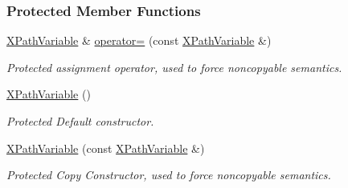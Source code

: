 \subsubsection*{Protected Member Functions}
\begin{DoxyCompactItemize}
\item 
\hyperlink{classphys_1_1xml_1_1XPathVariable}{XPathVariable} \& \hyperlink{classphys_1_1xml_1_1XPathVariable_aa0d4555101b253e1864a5226dd098ad3}{operator=} (const \hyperlink{classphys_1_1xml_1_1XPathVariable}{XPathVariable} \&)
\begin{DoxyCompactList}\small\item\em Protected assignment operator, used to force noncopyable semantics. \item\end{DoxyCompactList}\item 
\hypertarget{classphys_1_1xml_1_1XPathVariable_a8dd3bc4deb8cebad6796ffa10bbbcb21}{
\hyperlink{classphys_1_1xml_1_1XPathVariable_a8dd3bc4deb8cebad6796ffa10bbbcb21}{XPathVariable} ()}
\label{classphys_1_1xml_1_1XPathVariable_a8dd3bc4deb8cebad6796ffa10bbbcb21}

\begin{DoxyCompactList}\small\item\em Protected Default constructor. \item\end{DoxyCompactList}\item 
\hypertarget{classphys_1_1xml_1_1XPathVariable_a37a47c3f05c4509f83193c1fa1c355e5}{
\hyperlink{classphys_1_1xml_1_1XPathVariable_a37a47c3f05c4509f83193c1fa1c355e5}{XPathVariable} (const \hyperlink{classphys_1_1xml_1_1XPathVariable}{XPathVariable} \&)}
\label{classphys_1_1xml_1_1XPathVariable_a37a47c3f05c4509f83193c1fa1c355e5}

\begin{DoxyCompactList}\small\item\em Protected Copy Constructor, used to force noncopyable semantics. \item\end{DoxyCompactList}\end{DoxyCompactItemize}
